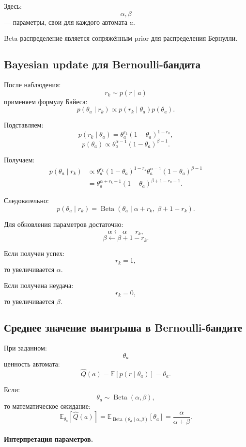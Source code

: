 \documentclass[12pt,a4paper]{article}
\begin{document}
Здесь:
\[
\alpha,\beta
\]
--- параметры, свои для каждого автомата $a$.

Beta-распределение является сопряжённым prior для распределения Бернулли.

\subsection{Bayesian update для Bernoulli-бандита}

После наблюдения:
\[
r_k\sim p(r\mid a)
\]
применяем формулу Байеса:
\[
p(\theta_a\mid r_k)
\propto
p(r_k\mid\theta_a)p(\theta_a).
\]

Подставляем:
\[
p(r_k\mid\theta_a)
=
\theta_a^{r_k}
(1-\theta_a)^{1-r_k},
\]
\[
p(\theta_a)
\propto
\theta_a^{\alpha-1}
(1-\theta_a)^{\beta-1}.
\]

Получаем:
\[
\begin{aligned}
p(\theta_a\mid r_k)
&\propto
\theta_a^{r_k}
(1-\theta_a)^{1-r_k}
\theta_a^{\alpha-1}
(1-\theta_a)^{\beta-1}
\\
&=
\theta_a^{\alpha+r_k-1}
(1-\theta_a)^{\beta+1-r_k-1}.
\end{aligned}
\]

Следовательно:
\[
p(\theta_a\mid r_k)
=
\operatorname{Beta}
\left(
\theta_a
\mid
\alpha+r_k,\;
\beta+1-r_k
\right).
\]

Для обновления параметров достаточно:
\[
\alpha\leftarrow \alpha+r_k,
\]
\[
\beta\leftarrow \beta+1-r_k.
\]

Если получен успех:
\[
r_k=1,
\]
то увеличивается $\alpha$.

Если получена неудача:
\[
r_k=0,
\]
то увеличивается $\beta$.

\subsection{Среднее значение выигрыша в Bernoulli-бандите}

При заданном:
\[
\theta_a
\]
ценность автомата:
\[
\hat Q(a)
=
\mathbb E
\left[
p(r\mid\theta_a)
\right]
=
\theta_a.
\]

Если:
\[
\theta_a\sim \operatorname{Beta}(\alpha,\beta),
\]
то математическое ожидание:
\[
\mathbb E_{\theta_a}
\left[
\hat Q(a)
\right]
=
\mathbb E_{\operatorname{Beta}(\theta_a\mid\alpha,\beta)}
\left[
\theta_a
\right]
=
\frac{\alpha}{\alpha+\beta}.
\]

\paragraph{Интерпретация параметров.}
\end{document}
